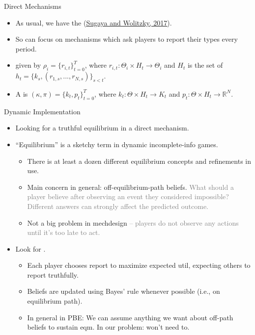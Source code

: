 \documentclass[english,10pt
,aspectratio=169
]{beamer}
\begin{document}
\begin{frame}{Direct Mechanisms}
\begin{itemize}
	\item As usual, we have the  (\href{https://doi.org/10.3982/TE2270}{\uline{Sugaya and Wolitzky, 2017}}).
	\item So can focus on mechanisms which ask players to report their types every period.
	\item {} given by $\rho_i = \{r_{i,t}\}_{t=0}^T$, where $r_{i,t}: \Theta_i \times H_t \to \Theta_i$ and $H_t$ is the set of  $h_t = \{k_s,(r_{1,s},...,r_{N,s})\}_{s < t}$.
	\item A  is $(\kappa,\pi) = \{k_t,p_t\}_{t=0}^T$, where $k_t: \Theta \times H_t \to K_t$ and $p_t: \Theta \times H_t \to \mathbb{R}^N$.
\end{itemize}
\end{frame}


\begin{frame}{Dynamic Implementation}
\begin{itemize}
	\item Looking for a truthful equilibrium in a direct mechanism.
	\item ``Equilibrium'' is a sketchy term in dynamic incomplete-info games.
	\begin{itemize}
		\item There is at least a dozen different equilibrium concepts and refinements in use.
		\item Main concern in general: off-equilibrium-path beliefs. \textcolor{gray}{What should a player believe after observing an event they considered impossible? Different answers can strongly affect the predicted outcome.}
		\item Not a big problem in mechdesign \textcolor{gray}{-- players do not observe any actions until it's too late to act.}
	\end{itemize}
	\item Look for .
	\begin{itemize}
		\item Each player chooses report to maximize expected util, expecting others to report truthfully.
		\item Beliefs are updated using Bayes' rule whenever possible (i.e., on equilibrium path).
		\item In general in PBE: We can assume anything we want about off-path beliefs to sustain eqm. In our problem: won't need to.
	\end{itemize}
\end{itemize}
\end{frame}
\end{document}
